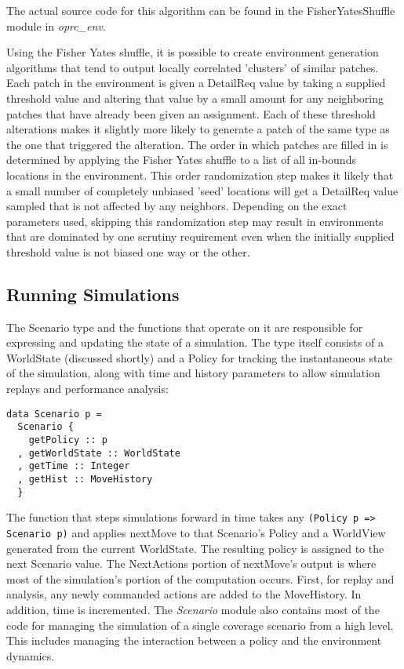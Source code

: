 The actual source code for this algorithm can be found in the FisherYatesShuffle module in \textit{oprc\_env}.

Using the Fisher Yates shuffle, it is possible to create environment generation algorithms that tend to output locally correlated 'clusters' of similar patches. Each patch in the environment is given a DetailReq value by taking a supplied threshold value and altering that value by a small amount for any neighboring patches that have already been given an assignment. Each of these threshold alterations makes it slightly more likely to generate a patch of the same type as the one that triggered the alteration. The order in which patches are filled in is determined by applying the Fisher Yates shuffle to a list of all in-bounds locations in the environment. This order randomization step makes it likely that a small number of completely unbiased 'seed' locations will get a DetailReq value sampled that is not affected by any neighbors. Depending on the exact parameters used, skipping this randomization step may result in environments that are dominated by one scrutiny requirement even when the initially supplied threshold value is not biased one way or the other.

\subsection{Running Simulations}

The Scenario type and the functions that operate on it are responsible for expressing and updating the state of a simulation. The type itself consists of a WorldState (discussed shortly) and a Policy for tracking the instantaneous state of the simulation, along with time and history parameters to allow simulation replays and performance analysis:

\begin{verbatim}
data Scenario p =
  Scenario {
    getPolicy :: p
  , getWorldState :: WorldState
  , getTime :: Integer
  , getHist :: MoveHistory
  }
\end{verbatim}

The function that steps simulations forward in time takes any \verb|(Policy p => Scenario p)| and applies nextMove to that Scenario's Policy and a WorldView generated from the current WorldState. The resulting policy is assigned to the next Scenario value. The NextActions portion of nextMove's output is where most of the simulation's portion of the computation occurs. First, for replay and analysis, any newly commanded actions are added to the MoveHistory. In addition, time is incremented. The \textit{Scenario} module also contains most of the code for managing the simulation of a single coverage scenario from a high level. This includes managing the interaction between a policy and the environment dynamics.

